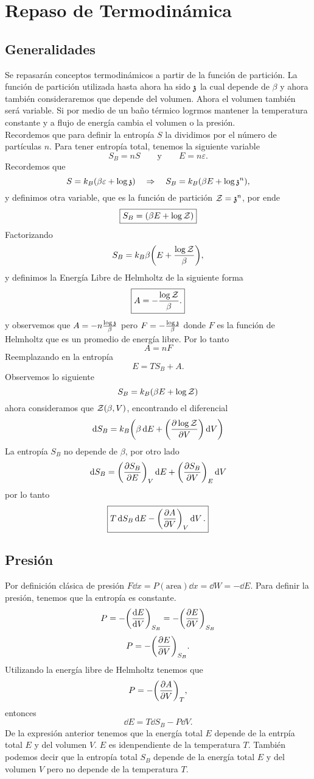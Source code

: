 \chapter{Repaso de Termodinámica}

\section{Generalidades}
Se repasarán conceptos termodinámicos a partir de la función de partición. La función de partición utilizada hasta ahora ha sido $\mathfrak{z}$ la cual depende de $\beta$ y ahora también consideraremos que depende del volumen. Ahora el volumen también será variable. Si por medio de un baño térmico logrmos mantener la temperatura constante y a flujo de energía cambia el volumen o la presión. \\

Recordemos que para definir la entropía $S$ la dividimos por el número de partículas $n$. Para tener entropía total, tenemos la siguiente variable
	$$ S_B = nS \qquad \text{y} \qquad E = n\varepsilon . $$
Recordemos que
	$$ S = k_B \qty(\beta \varepsilon + \log{\mathfrak{z}}) \quad \Rightarrow \quad S_B = k_B \qty(\beta E + \log{\mathfrak{z}^n}), $$
y definimos otra variable, que es la función de partición $\mathcal{Z} = \mathfrak{z} ^n$, por ende
	$$ \boxed{ S_B = \qty(\beta E + \log{\mathcal{Z}}) } $$
Factorizando
	$$ S_B = k_B \beta \qty(E + \frac{\log{\mathcal{Z}}}{\beta}), $$
y definimos la Energía Libre de Helmholtz de la siguiente forma
	$$ \boxed{ A = -\frac{\log{\mathcal{Z}}}{\beta} . } $$
y observemos que $A = -n\frac{\log{\mathfrak{z}}}{\beta}$ pero $F = -\frac{\log{\mathfrak{z}}}{\beta}$ donde $F$ es la función de Helmholtz que es un promedio de energía libre. Por lo tanto
	$$ \boxed{A = nF} $$
Reemplazando en la entropía
	$$ \boxed{E = TS_B + A.} $$
Observemos lo siguiente
	$$ S_B = k_B \qty(\beta E + \log{\mathcal{Z}}) $$
ahora consideramos que $\mathcal{Z} (\beta ,V)$, encontrando el diferencial
	$$ \dd{S_B} = k_B \qty(\beta \dd{E} + \qty(\pdv{\log{\mathcal{Z}}}{V}) \dd{V}) $$
La entropía $S_B$  no depende de $\beta$, por otro lado
	$$ \dd{S_B} = \qty(\pdv{S_B}{E})_V \dd{E} + \qty(\pdv{S_B}{V}) _E \dd{V} $$
por lo tanto
	$$ \boxed{ T\dd{S_B}  \dd{E} - \qty(\pdv{A}{V})_V \dd{V}. } $$


\section{Presión}
Por definición clásica de presión $F\dd{x} = P(\text{area}) \dd{x} = \dd{W} = -\dd{E}$. Para definir la presión, tenemos que la entropía es constante.
	$$ P = -\qty(\dv{E}{V}) _{S_B} = -\qty(\pdv{E}{V})_{S_B} $$
	$$ P = -\qty(\pdv{E}{V})_{S_B}. $$
Utilizando la energía libre de Helmholtz tenemos que
	$$ P = -\qty(\pdv{A}{V})_T, $$
entonces
	$$ \dd{E} = T\dd{S_B} - P\dd{V}. $$
De la expresión anterior tenemos que la energía total $E$ depende de la entrpía total $E$ y del volumen $V$. $E$ es idenpendiente de la temperatura $T$. También podemos decir que la entropía total $S_B$ depende de la energía total $E$ y del volumen $V$ pero no depende de la temperatura $T$. \\


